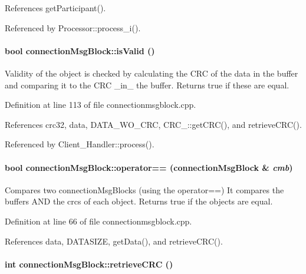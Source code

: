 References get\-Participant().

Referenced by Processor::process\_\-i().\hypertarget{classconnectionMsgBlock_connectionMsgBlocka4}{
\paragraph[isValid]{\setlength{\rightskip}{0pt plus 5cm}bool connection\-Msg\-Block::is\-Valid ()}\hfill}
\label{classconnectionMsgBlock_connectionMsgBlocka4}


Validity of the object is checked by calculating the CRC of the data in the buffer and comparing it to the CRC \_\-in\_\- the buffer. Returns true if these are equal. 

Definition at line 113 of file connectionmsgblock.cpp.

References crc32, data, DATA\_\-WO\_\-CRC, CRC\_::get\-CRC(), and retrieve\-CRC().

Referenced by Client\_\-Handler::process().\hypertarget{classconnectionMsgBlock_connectionMsgBlocka5}{
\paragraph[operator==]{\setlength{\rightskip}{0pt plus 5cm}bool connection\-Msg\-Block::operator== (connection\-Msg\-Block \& {\em cmb})}\hfill}
\label{classconnectionMsgBlock_connectionMsgBlocka5}


Compares two connection\-Msg\-Blocks (using the operator==) It compares the buffers AND the crcs of each object. Returns true if the objects are equal. 

Definition at line 66 of file connectionmsgblock.cpp.

References data, DATASIZE, get\-Data(), and retrieve\-CRC().\hypertarget{classconnectionMsgBlock_connectionMsgBlocka3}{
\paragraph[retrieveCRC]{\setlength{\rightskip}{0pt plus 5cm}int connection\-Msg\-Block::retrieve\-CRC ()}\hfill}
\label{classconnectionMsgBlock_connectionMsgBlocka3}



